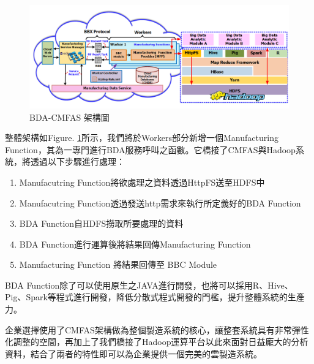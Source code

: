 \documentclass[CJK,12pt,t]{article}
\begin{document}
\begin{CJK*}{UTF8}{bkai}
		\begin{figure}[ht]
			\begin{center}
				\includegraphics[scale=0.5]{figs/bda-cmfas.png}
				\caption{BDA-CMFAS 架構圖}
				\label{bda1}
			\end{center}
		\end{figure}

		整體架構如Figure. \ref{bda1}所示，我們將於Workers部分新增一個Manufacturing Function，其為一專門進行BDA服務呼叫之函數。它橋接了CMFAS與Hadoop系統，將透過以下步驟進行處理：
		\begin{enumerate}
			\item Manufacutring Function將欲處理之資料透過HttpFS送至HDFS中
			\item Manufacutring Function透過發送http需求來執行所定義好的BDA Function
			\item BDA Function自HDFS撈取所要處理的資料
			\item BDA Function進行運算後將結果回傳Manufacturing Function
			\item Manufacturing Function 將結果回傳至 BBC Module
		\end{enumerate}

		BDA Function除了可以使用原生之JAVA進行開發，也將可以採用R、Hive、Pig、Spark等程式進行開發，降低分散式程式開發的門檻，提升整體系統的生產力。

		企業選擇使用了CMFAS架構做為整個製造系統的核心，讓整套系統具有非常彈性化調整的空間，再加上了我們橋接了Hadoop運算平台以此來面對日益龐大的分析資料，結合了兩者的特性即可以為企業提供一個完美的雲製造系統。

\end{CJK*}
\end{document}
